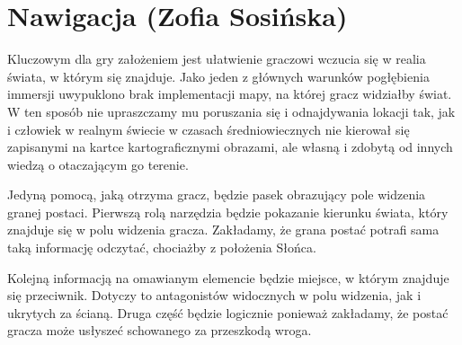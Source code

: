 \section{Nawigacja (Zofia Sosińska)}\label{chap:naw}

Kluczowym dla gry założeniem jest ułatwienie graczowi wczucia się w realia świata, w którym się znajduje. 
Jako jeden z głównych warunków pogłębienia immersji uwypuklono brak implementacji mapy, na której gracz widziałby świat. 
W ten sposób nie upraszczamy mu poruszania się i odnajdywania lokacji tak,
jak i człowiek w realnym świecie w czasach średniowiecznych nie kierował się zapisanymi na kartce kartograficznymi obrazami, 
ale własną i zdobytą od innych wiedzą o otaczającym go terenie. 

Jedyną pomocą, jaką otrzyma gracz, będzie pasek obrazujący pole widzenia granej postaci.
Pierwszą rolą narzędzia będzie pokazanie kierunku świata, który znajduje się w polu widzenia gracza.
Zakładamy, że grana postać potrafi sama taką informację odczytać, chociażby z położenia Słońca.

Kolejną informacją na omawianym elemencie będzie miejsce, w którym znajduje się przeciwnik. 
Dotyczy to antagonistów widocznych w polu widzenia, jak i ukrytych za ścianą. 
Druga część będzie logicznie ponieważ zakładamy, że postać gracza może usłyszeć 
schowanego za przeszkodą wroga.

